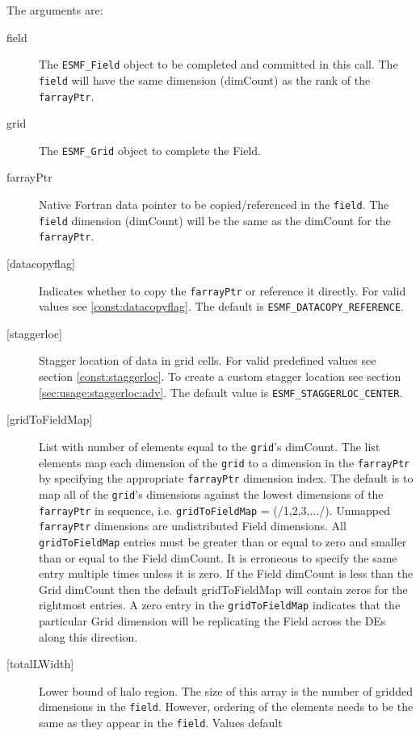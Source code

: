    The arguments are: 
   \begin{description} 
   \item [field] 
   The {\tt ESMF\_Field} object to be completed and 
   committed in this call. The {\tt field} will have the same dimension 
   (dimCount) as the rank of the {\tt farrayPtr}. 
   \item [grid] 
   The {\tt ESMF\_Grid} object to complete the Field. 
   \item [farrayPtr] 
   Native Fortran data pointer to be copied/referenced in the {\tt field}. 
   The {\tt field} dimension (dimCount) will be the same as the dimCount 
   for the {\tt farrayPtr}. 
   \item [{[datacopyflag]}] 
   Indicates whether to copy the {\tt farrayPtr} or reference it directly. 
   For valid values see \ref{const:datacopyflag}. The default is 
   {\tt ESMF\_DATACOPY\_REFERENCE}. 
   \item [{[staggerloc]}] 
   Stagger location of data in grid cells. For valid 
   predefined values see section \ref{const:staggerloc}. 
   To create a custom stagger location see section 
   \ref{sec:usage:staggerloc:adv}. The default 
   value is {\tt ESMF\_STAGGERLOC\_CENTER}. 
   \item [{[gridToFieldMap]}] 
   List with number of elements equal to the 
   {\tt grid}'s dimCount. The list elements map each dimension 
   of the {\tt grid} to a dimension in the {\tt farrayPtr} by 
   specifying the appropriate {\tt farrayPtr} dimension index. The 
   default is to map all of the {\tt grid}'s dimensions against the 
   lowest dimensions of the {\tt farrayPtr} in sequence, i.e. 
   {\tt gridToFieldMap} = (/1,2,3,.../). 
   Unmapped {\tt farrayPtr} dimensions are undistributed Field 
   dimensions. 
   All {\tt gridToFieldMap} entries must be greater than or equal 
   to zero and smaller than or equal to the Field dimCount. It is erroneous 
   to specify the same entry multiple times unless it is zero. 
   If the Field dimCount is less than the Grid dimCount then the default 
   gridToFieldMap will contain zeros for the rightmost entries. A zero 
   entry in the {\tt gridToFieldMap} indicates that the particular 
   Grid dimension will be replicating the Field across the DEs along 
   this direction. 
   \item [{[totalLWidth]}] 
   Lower bound of halo region. The size of this array is the number 
   of gridded dimensions in the {\tt field}. However, ordering of the elements 
   needs to be the same as they appear in the {\tt field}. Values default 

\end{description}
